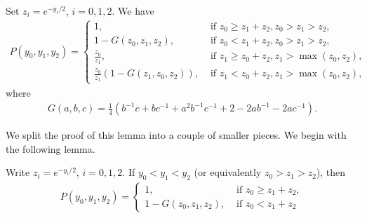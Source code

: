 \begin{lemma}\label{lem:triangle_prob_y_coordinates}
Set $z_i = e^{-y_i/2}$, $i=0,1,2$. We have
\begin{align*}
P(y_0,y_1,y_2) = \begin{cases}
	1, &\text{ if } z_0 \geq z_1+z_2, z_0 > z_1 > z_2, \\
	1-G(z_0,z_1,z_2), &\text{ if } z_0 < z_1+z_2, z_0 > z_1 > z_2, \\
	\frac{z_0}{z_1}, &\text{ if } z_1 \geq z_0+z_2, z_1 > \max(z_0,z_2), \\
	\frac{z_0}{z_1}\left(1-G(z_1,z_0,z_2)\right), &\text{ if } z_1 < z_0+z_2, z_1 > \max(z_0,z_2),
\end{cases}
\end{align*}
where 
\begin{align*}
G(a,b,c) = \frac{1}{4}
\left( b^{-1}c + bc^{-1} + a^2b^{-1}c^{-1} + 2 - 2ab^{-1}-2ac^{-1}\right).
\end{align*}
\end{lemma}



We split the proof of this lemma into a couple of smaller pieces. We begin with the following lemma.

\begin{lemma}\label{lem:ordered}
Write $z_i = e^{-y_i/2}$, $i=0,1,2$. If $y_0<y_1<y_2$ (or equivalently $z_0 > z_1 > z_2$), then
\begin{align*}
P(y_0,y_1,y_2) = \begin{cases}
1, &\text{ if } z_0 \geq z_1+z_2,  \\
1-G(z_0,z_1,z_2), &\text{ if } z_0 < z_1+z_2
\end{cases}
\end{align*}
\end{lemma}

